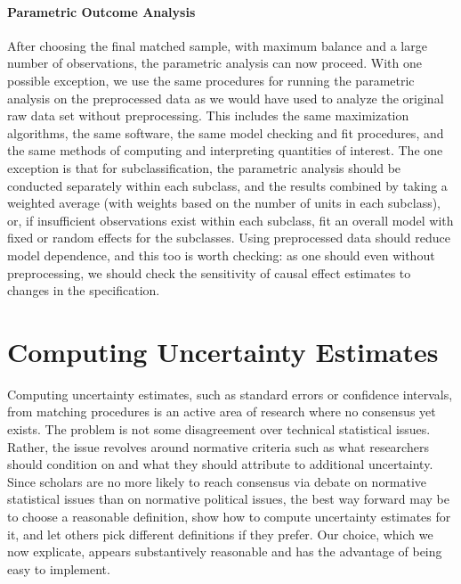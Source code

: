 \documentclass[11pt,titlepage]{article}
\begin{document}
\paragraph{Parametric Outcome Analysis}  
After choosing the final matched sample, with maximum balance and a
large number of observations, the parametric analysis can now proceed.
With one possible exception, we use the same procedures for running
the parametric analysis on the preprocessed data as we would have used
to analyze the original raw data set without preprocessing.  This
includes the same maximization algorithms, the same software, the same
model checking and fit procedures, and the same methods of computing
and interpreting quantities of interest.  The one exception is that
for subclassification, the parametric analysis should be conducted
separately within each subclass, and the results combined by taking a
weighted average (with weights based on the number of units in each
subclass), or, if insufficient observations exist within each
subclass, fit an overall model with fixed or random effects for the
subclasses.  Using preprocessed data should reduce model dependence,
and this too is worth checking: as one should even without
preprocessing, we should check the sensitivity of causal effect
estimates to changes in the specification.

\section{Computing Uncertainty Estimates}

Computing uncertainty estimates, such as standard errors or confidence
intervals, from matching procedures is an active area of research
where no consensus yet exists.  The problem is not some disagreement
over technical statistical issues.  Rather, the issue revolves around
normative criteria such as what researchers should condition on and
what they should attribute to additional uncertainty.  Since scholars
are no more likely to reach consensus via debate on normative
statistical issues than on normative political issues, the best way
forward may be to choose a reasonable definition, show how to
compute uncertainty estimates for it, and let others pick different
definitions if they prefer.  Our choice, which we now explicate,
appears substantively reasonable and has the advantage of being easy
to implement.
\end{document}
